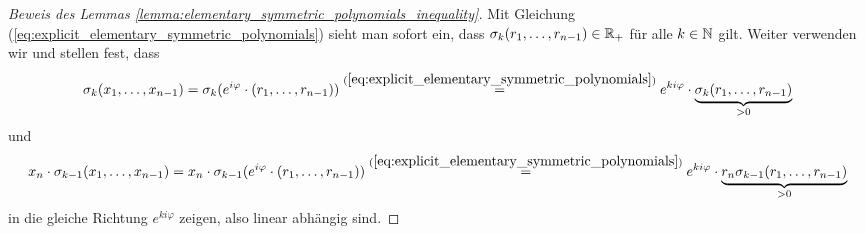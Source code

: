 \begin{proof}[Beweis des Lemmas \ref{lemma:elementary_symmetric_polynomials_inequality}]
    \noindent Mit Gleichung
    (\ref{eq:explicit_elementary_symmetric_polynomials})
    sieht man sofort ein, dass
    $\sigma_k(r_1, \dots, r_{n-1}) \in \mathbb{R}_{+}$ für alle $k \in \mathbb{N}$ gilt.
    Weiter verwenden wir
    und stellen fest, dass
    \begin{equation*}
        \sigma_{k}(x_1, \dots, x_{n-1})
        = \sigma_k(e^{i \varphi} \cdot (r_1, \dots, r_{n-1}))
        \overset{(\ref{eq:explicit_elementary_symmetric_polynomials})}{=}
            e^{k i \varphi} \cdot \underbrace{\sigma_k(r_1, \dots, r_{n-1})}_{> 0}
    \end{equation*}
    und
    \begin{equation*}
        x_n \cdot \sigma_{k-1}(x_1, \dots, x_{n-1})
        = x_n \cdot \sigma_{k-1}(e^{i \varphi} \cdot (r_1, \dots, r_{n-1}))
        \overset{(\ref{eq:explicit_elementary_symmetric_polynomials})}{=}
            e^{k i \varphi} \cdot \underbrace{r_n \sigma_{k-1}(r_1, \dots, r_{n-1})}_{> 0}
    \end{equation*}
    \enlargethispage{2em}
    in die gleiche Richtung $e^{k i\varphi}$ zeigen, also linear abhängig
    sind.
\end{proof}

